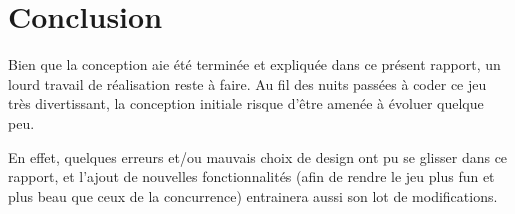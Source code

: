 \newpage
\section{Conclusion}
	Bien que la conception aie été terminée et expliquée dans ce présent rapport, un lourd travail de réalisation reste à faire. Au fil des nuits passées à coder ce jeu très divertissant, la conception initiale risque d'être amenée à évoluer quelque peu.

	En effet, quelques erreurs et/ou mauvais choix de design ont pu se glisser dans ce rapport, et l'ajout de nouvelles fonctionnalités (afin de rendre le jeu plus fun et plus beau que ceux de la concurrence) entrainera aussi son lot de modifications.